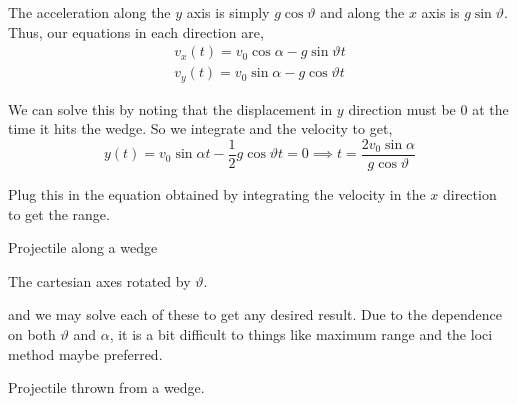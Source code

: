 \begin{exc}
    \begin{solution}
        The acceleration along the \(y\) axis is simply \(g\cos\vartheta\) and along the \(x\) axis 
        is \(g\sin\vartheta\). Thus, our equations in each direction are,
            \begin{align*}
                v_x(t) = v_0\cos\alpha - g\sin\vartheta t\\
                v_y(t) = v_0\sin\alpha - g\cos\vartheta t 
            \end{align*}

        We can solve this by noting that the displacement in \(y\) direction must be \(0\) at the time 
        it hits the wedge. So we integrate and the velocity to get, 
            \begin{equation*}
                y(t) = v_0\sin\alpha t - \frac{1}{2}g\cos\vartheta t = 0 \implies t = \frac{2v_0\sin\alpha}{g\cos\vartheta} 
            \end{equation*}
        
        Plug this in the equation obtained by integrating the velocity in the \(x\) direction to get the range.
    \end{solution}
\end{exc}

\begin{marginfigure}
    \vspace{-8em}
    \centering
    \caption{Projectile along a wedge}
    \label{fig: projectilealongwedge}
\end{marginfigure}


\begin{marginfigure}
    \centering
    \caption{The cartesian axes rotated by \(\vartheta\).}
    \label{fig: projectilerotatedaxes}
\end{marginfigure}

and we may solve each of these to get any desired result. Due to the dependence 
on both \(\vartheta\) and \(\alpha\), it is a bit difficult to things like maximum range
and the loci method maybe preferred.  

\begin{marginfigure}
    \vspace{2em}
    \centering
    \caption{Projectile thrown from a wedge.}
    \label{fig: projectile wedge example}
\end{marginfigure}

